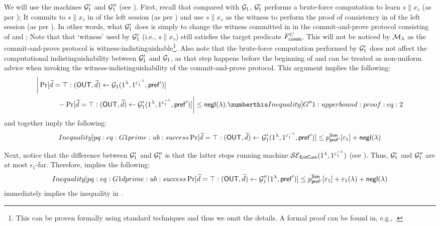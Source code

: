 We will use the machines $\mathcal{G}_1'$ and $\mathcal{G}_1''$ (see ). First, recall that compared with $\mathcal{G}_1$, $\mathcal{G}'_1$ performs a brute-force computation to learn $s \| x_s$ (as per ); It commits to $s\|x_s$ in  of the left session (as per ) and use $s\|x_s$ as the witness to perform the proof of consistency in  of the left session (as per ). In other words, what $\mathcal{G}_1'$ does is simply to change the witness committed in  in the commit-and-prove protocol consisting of  and ; Note that that `witness' used by $\mathcal{G}'_1$ (i.e., $s\|x_s$) still satisfies the target predicate $F^C_{\mathsf{consis}}$. This will not be noticed by $\mathcal{M}_\lambda$ as the commit-and-prove protocol is witness-indistinguishable\footnote{This can be proven formally using standard techniques and thus we omit the details. A formal proof can be found in, e.g., \cite[Section 6.5]{C:CCLY22}.}. Also note that the brute-force computation performed by $\mathcal{G}'_1$ does not affect the computational indistinguishability between $\mathcal{G}'_1$ and $\mathcal{G}_1$, as that step happens before the beginning of  and can be treated as non-uniform advice when invoking the witness-indistinguishability of the commit-and-prove protocol. This argument implies the following:
\begin{align*}
& \bigg|\Pr[\tilde{d} = \top : (\OUT,\tilde{d}) \gets \mcal{G}_1{(1^\secpar, 1^{\epsilon_1^{-1}},  \msf{pref}')}] \\
&\hspace{3em} - \Pr[\tilde{d} = \top : (\OUT,\tilde{d}) \gets \mcal{G}_1'{(1^\secpar, 1^{\epsilon_1^{-1}},  \msf{pref}')}]\bigg| \leq \negl(\secpar). \numberthis \label[Inequality]{G''1:upperbound:proof:eq:2}
\end{align*}
 and  together imply the following:
\begin{equation}\label[Inequality]{pq:eq:G1prime:ub:success}
    \Pr[\tilde{d} = \top : (\OUT,\tilde{d}) \gets \mcal{G}_1'{(1^\secpar, 1^{\epsilon_1^{-1}},  \msf{pref}')}] \leq p^{\msf{Sim}}_{\msf{pref'}}[\epsilon_1] +\negl(\secpar)
\end{equation}


Next, notice that the difference between $\mathcal{G}'_1$ and $\mathcal{G}''_1$ is that the latter stops running machine $\mathcal{SE}_\mathsf{ExtCom}(1^\lambda, 1^{\varepsilon_1^{-1}})$ (see ). Thus, $\mathcal{G}'_1$ and $\mathcal{G}''_1$ are at most $\epsilon_1$-far. Therefore,  implies the following:
\begin{equation}\label[Inequality]{pq:eq:G1dprime:ub:success}
    \Pr[\tilde{d} = \top : (\OUT,\tilde{d}) \gets \mcal{G}_1''{(1^\secpar,  \msf{pref}')}] \leq p^{\msf{Sim}}_{\msf{pref'}}[\epsilon_1] + \epsilon_1(\secpar) +\negl(\secpar)
\end{equation}
 immediately implies the inequality in .


